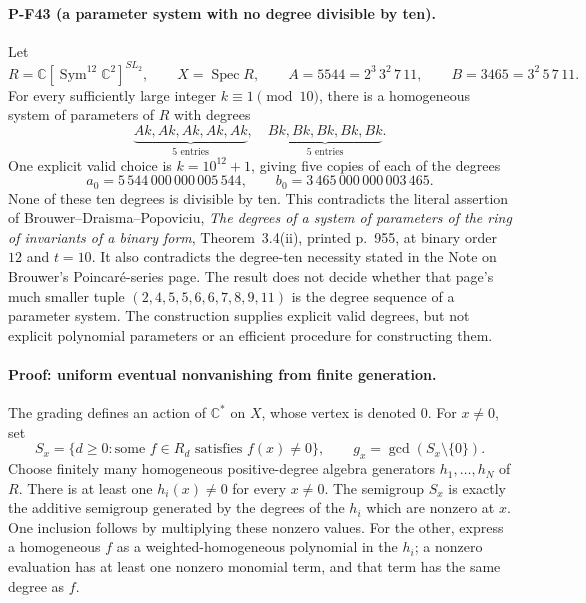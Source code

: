\documentclass[11pt,a4paper]{article}
\begin{document}
\paragraph{P-F43 (a parameter system with no degree divisible by ten).}
Let
\[
 R=\mathbb C[\operatorname{Sym}^{12}\mathbb C^2]^{SL_2},
 \qquad X=\operatorname{Spec}R,
 \qquad A=5544=2^3\,3^2\,7\,11,
 \qquad B=3465=3^2\,5\,7\,11.
\]
For every sufficiently large integer $k\equiv1\pmod {10}$,
there is a homogeneous system of parameters of $R$ with degrees
\[
 \underbrace{Ak,Ak,Ak,Ak,Ak}_{5\text{ entries}},\quad
 \underbrace{Bk,Bk,Bk,Bk,Bk}_{5\text{ entries}}.
 \tag{P-F43a}
\]
One explicit valid choice is $k=10^{12}+1$, giving five copies
of each of the degrees
\[
 a_0=5\,544\,000\,000\,005\,544,\qquad
 b_0=3\,465\,000\,000\,003\,465.
 \tag{P-F43a'}
\]
None of these ten degrees is divisible by ten. This contradicts
the literal assertion of Brouwer--Draisma--Popoviciu,
\emph{The degrees of a system of parameters of the ring of
invariants of a binary form}, Theorem~3.4(ii), printed p.~955,
at binary order $12$ and $t=10$. It also contradicts the
degree-ten necessity stated in the Note on Brouwer's
Poincar\'e-series page. The result does not decide whether
that page's much smaller tuple
$(2,4,5,5,6,6,7,8,9,11)$ is the degree sequence of a parameter
system. The construction supplies explicit valid degrees,
but not explicit polynomial parameters or an efficient
procedure for constructing them.

\paragraph{Proof: uniform eventual nonvanishing from finite generation.}
The grading defines an action of $\mathbb C^*$ on $X$, whose
vertex is denoted $0$. For $x\ne0$, set
\[
 S_x=\{d\ge0:\text{some }f\in R_d\text{ satisfies }f(x)\ne0\},
 \qquad g_x=\gcd(S_x\setminus\{0\}).
 \tag{P-F43b}
\]
Choose finitely many homogeneous positive-degree algebra
generators $h_1,\ldots,h_N$ of $R$. There is at least one
$h_i(x)\ne0$ for every $x\ne0$. The semigroup $S_x$ is exactly
the additive semigroup generated by the degrees of the
$h_i$ which are nonzero at $x$. One inclusion follows by
multiplying these nonzero values. For the other, express a
homogeneous $f$ as a weighted-homogeneous polynomial in the
$h_i$; a nonzero evaluation has at least one nonzero monomial
term, and that term has the same degree as $f$.
\end{document}
